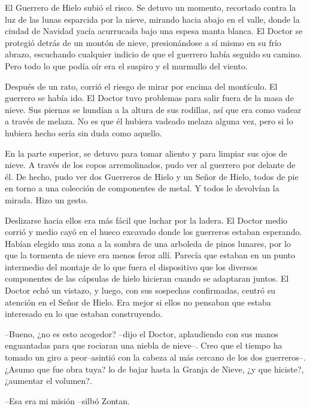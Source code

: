 El Guerrero de Hielo subió el risco. Se detuvo un momento, recortado contra la luz de las lunas esparcida por la nieve, mirando hacia abajo en el valle, donde la ciudad de Navidad yacía acurrucada bajo una espesa manta blanca. El Doctor se protegió detrás de un montón de nieve, presionándose a sí mismo en su frío abrazo, escuchando cualquier indicio de que el guerrero había seguido su camino. Pero todo lo que podía oír era el suspiro y el murmullo del viento.



Después de un rato, corrió el riesgo de mirar por encima del montículo. El guerrero se había ido. El Doctor tuvo problemas para salir fuera de la masa de nieve. Sus piernas se hundían a la altura de sus rodillas, así que era como vadear a través de melaza. No es que él hubiera vadeado melaza alguna vez, pero si lo hubiera hecho sería sin duda como aquello.



En la parte superior, se detuvo para tomar aliento y para limpiar sus ojos de nieve. A través de los copos arremolinados, pudo ver al guerrero por delante de él. De hecho, pudo ver dos Guerreros de Hielo y un Señor de Hielo, todos de pie en torno a una colección de componentes de metal. Y todos le devolvían la mirada. Hizo un gesto.



Deslizarse hacia ellos era más fácil que luchar por la ladera. El Doctor medio corrió y medio cayó en el hueco excavado donde los guerreros estaban esperando. Habían elegido una zona a la sombra de una arboleda de pinos lunares, por lo que la tormenta de nieve era menos feroz allí. Parecía que estaban en un punto intermedio del montaje de lo que fuera el dispositivo que los diversos componentes de las cápsulas de hielo hicieran cuando se adaptaran juntos. El Doctor echó un vistazo, y luego, con sus sospechas confirmadas, centró su atención en el Señor de Hielo. Era mejor si ellos no pensaban que estaba interesado en lo que estaban construyendo.



--Bueno, ¿no es esto acogedor? --dijo el Doctor, aplaudiendo con sus manos enguantadas para que rociaran una niebla de nieve--. Creo que el tiempo ha tomado un giro a peor--asintió con la cabeza al más cercano de los dos guerreros--. ¿Asumo que fue obra tuya? lo de bajar hasta la Granja de Nieve, ¿y que hiciste?,¿aumentar el volumen?.



--Esa era mi misión --silbó Zontan.



